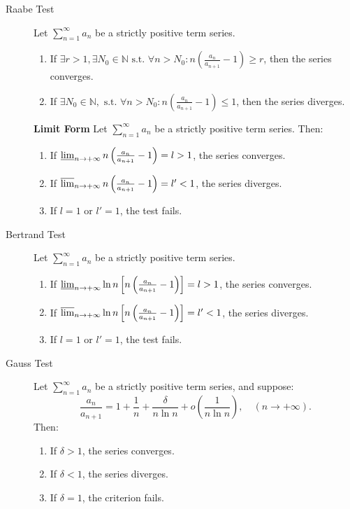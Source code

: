 \documentclass[11pt]{../../TexTemplate/elegantbook}
\begin{document}
\begin{theorem}
\begin{description}
    \item[Raabe Test] Let \( \sum_{n=1}^{\infty} a_n \) be a strictly positive term series.
        \begin{enumerate}
            \item If \( \exists r > 1, \exists N_0 \in \mathbb{N} \text{ s.t. } 
                \forall n > N_0: n \left( \frac{a_n}{a_{n+1}} - 1 \right) \geqslant r \), 
                then the series converges.
            \item If \( \exists N_0 \in \mathbb{N}, \text{ s.t. } \forall n > N_0: 
                n \left( \frac{a_n}{a_{n+1}} - 1 \right) \leqslant 1 \), then the series diverges.
        \end{enumerate}
        \textbf{Limit Form}
        Let \( \sum_{n=1}^{\infty} a_n \) be a strictly positive term series. Then:
        \begin{enumerate}
            \item If \( \varliminf_{n \to +\infty} n \left( \frac{a_n}{a_{n+1}} - 1 \right) = l > 1 \), the series converges.
            \item If \( \varlimsup_{n \to +\infty} n \left( \frac{a_n}{a_{n+1}} - 1 \right) = l' < 1 \), the series diverges.
            \item If \( l = 1 \) or \( l' = 1 \), the test fails.
        \end{enumerate}

    \item[Bertrand Test] Let \( \sum_{n=1}^{\infty} a_n \) be a strictly positive term series.
        \begin{enumerate}
            \item If \( \varliminf_{n \to +\infty} \ln n \left[ n \left( \frac{a_n}{a_{n+1}} - 1 \right) \right] = l > 1 \), 
                the series converges.
            \item If \( \varlimsup_{n \to +\infty} \ln n \left[ n \left( \frac{a_n}{a_{n+1}} - 1 \right) \right] = l' < 1 \), 
                the series diverges.
            \item If \( l = 1 \) or \( l' = 1 \), the test fails.
        \end{enumerate}

    \item [Gauss Test] Let \( \sum_{n=1}^{\infty} a_n \) be a strictly positive term series, and suppose:
        \[
        \frac{a_n}{a_{n+1}} = 1 + \frac{1}{n} + \frac{\delta}{n \ln n} + o\left( \frac{1}{n \ln n} \right), \quad (n \to +\infty).
        \]
        Then:
        \begin{enumerate}
            \item If \( \delta > 1 \), the series converges.
            \item If \( \delta < 1 \), the series diverges.
            \item If \( \delta = 1 \), the criterion fails.
        \end{enumerate}


\end{description}
\end{theorem}
\end{document}
